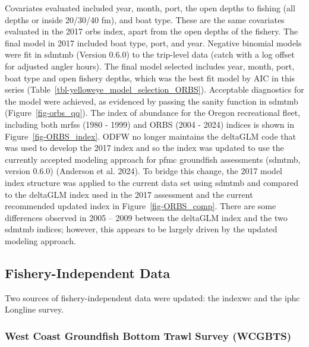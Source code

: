 \documentclass[
]{scrartcl}
\begin{document}
Covariates evaluated included year, month, port, the open depths to
fishing (all depths or inside 20/30/40 fm), and boat type. These are the
same covariates evaluated in the 2017 \gls{orbs} index, apart from the
open depths of the fishery. The final model in 2017 included boat type,
port, and year. Negative binomial models were fit in \gls{sdmtmb}
(Version 0.6.0) to the trip-level data (catch with a log offset for
adjusted angler hours). The final model selected includes year, month,
port, boat type and open fishery depths, which was the best fit model by
AIC in this series (Table~\ref{tbl-yelloweye_model_selection_ORBS}).
Acceptable diagnostics for the model were achieved, as evidenced by
passing the sanity function in \gls{sdmtmb} (Figure~\ref{fig-orbs_qq}).
The index of abundance for the Oregon recreational fleet, including both
\gls{mrfss} (1980 - 1999) and ORBS (2004 - 2024) indices is shown in
Figure~\ref{fig-ORBS_index}. ODFW no longer maintains the deltaGLM code
that was used to develop the 2017 index and so the index was updated to
use the currently accepted modeling approach for \gls{pfmc} groundfish
assessments (\gls{sdmtmb}, version 0.6.0) (Anderson et al. 2024). To
bridge this change, the 2017 model index structure was applied to the
current data set using \gls{sdmtmb} and compared to the deltaGLM index
used in the 2017 assessment and the current recommended updated index in
Figure~\ref{fig-ORBS_comp}. There are some differences observed in 2005
-- 2009 between the deltaGLM index and the two \gls{sdmtmb} indices;
however, this appears to be largely driven by the updated modeling
approach.

\subsection{Fishery-Independent Data}\label{fishery-independent-data}

Two sources of fishery-independent data were updated: the \gls{indexwc}
and the \gls{iphc} Longline survey.

\subsubsection{West Coast Groundfish Bottom Trawl Survey
(WCGBTS)}\label{west-coast-groundfish-bottom-trawl-survey-wcgbts}
\end{document}
